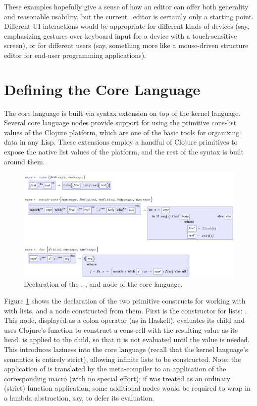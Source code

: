These examples hopefully give a sense of how an editor can offer both generality and reasonable usability, but the current \Meta\ editor is certainly only a starting point. Different UI interactions would be appropriate for different kinds of devices (say, emphasizing gestures over keyboard input for a device with a touch-sensitive screen), or for different users (say, something more like a mouse-driven structure editor for end-user programming applications).


%
%
\section{Defining the Core Language}
\label{for}
The core language is built via syntax extension on top of the kernel language. Several core language nodes provide support for using the primitive cons-list values of the Clojure platform, which are one of the basic tools for organizing data in any Lisp.
These extensions employ a handful of Clojure primitives to expose the native list values of the platform, and the rest of the syntax is built around them.

\begin{figure}[th]
	\centering
	
	\includegraphics[scale=0.6]{src/image/cons.pdf}
	
	\caption{Declaration of the , , and  node of the core language.}
	\label{fig-for-grammar}
\end{figure}

Figure \ref{fig-for-grammar} shows the declaration of the two primitive constructs for working with with lists, and a node constructed from them. First is the constructor for lists: . This node, displayed as a colon operator (as in Haskell), evaluates its  child and uses Clojure's  function to construct a cons-cell with the resulting value as its head.  is applied to the  child, so that it is not evaluated until the value is needed. This introduces laziness into the core language (recall that the kernel language's semantics is entirely strict), allowing infinite lists to be constructed. Note: the application of  is translated by the meta-compiler to an application of the corresponding macro (with no special effort); if  was treated as an ordinary (strict) function application, some additional nodes would be required to wrap  in a lambda abstraction, say, to defer its evaluation.

